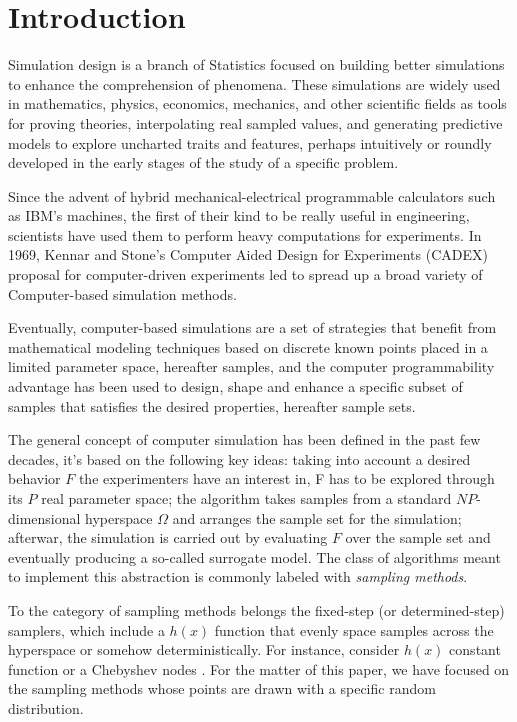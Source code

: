 \documentclass[12pt]{extarticle}
\begin{document}
\section{Introduction}
Simulation design is a branch of Statistics focused on building better simulations to enhance the comprehension of phenomena. These simulations are widely used in mathematics, physics, economics, mechanics, and other scientific fields as tools for proving theories, interpolating real sampled values, and generating predictive models to explore uncharted traits and features, perhaps intuitively or roundly developed in the early stages of the study of a specific problem.

Since the advent of hybrid mechanical-electrical programmable calculators such as IBM's machines, the first of their kind to be really useful in engineering, scientists have used them to perform heavy computations for experiments. In 1969, Kennar and Stone's Computer Aided Design for Experiments (CADEX) proposal for computer-driven experiments led to spread up a broad variety of Computer-based simulation methods.

Eventually, computer-based simulations are a set of strategies that benefit from mathematical modeling techniques based on discrete known points placed in a limited parameter space, hereafter samples, and the computer programmability advantage has been used to design, shape and enhance a specific subset of samples that satisfies the desired properties, hereafter sample sets. 

The general concept of computer simulation has been defined in the past few decades, it's based on the following key ideas: taking into account a desired behavior $ F $ the experimenters have an interest in, F has to be explored through its $ P $ real parameter space; the algorithm takes samples from a standard $ NP $-dimensional hyperspace $ \Omega $ and arranges the sample set for the simulation; afterwar, the simulation is carried out by evaluating $ F $ over the sample set and eventually producing a so-called surrogate model. The class of algorithms meant to implement this abstraction is commonly labeled with \textit{sampling methods}.

To the category of sampling methods belongs the fixed-step (or determined-step) samplers, which include a $h(x)$ function that evenly space samples across the hyperspace or somehow deterministically. For instance, consider $h(x)$ constant function or a Chebyshev nodes . For the matter of this paper, we have focused on the sampling methods whose points are drawn with a specific random distribution.
\end{document}
